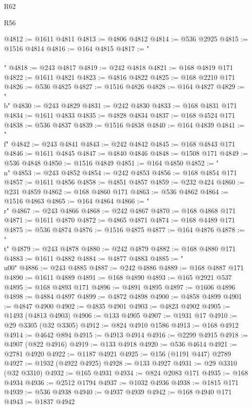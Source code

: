\begin{lexlean}{R62}
\begin{lexlean}{R56}
\begin{coremodule}
{{{{{{{{{{{{{{{{{{{{{{{{{{{{{{{{{{{{{{{{{{{{{{{{{{{{{{{{{{{{{{{{{{{{{{{{{{{{{{{{{{{{{{{{{{{{{{{{{{{{{{{{{{{{{{{{{{{{{{{{{{{{{{{{{{{{{{{{{{{{{{{{{{{{{{{{{{{{{{{{{{{{{{{{{{{{{{{{{{{{{{{{{{{{{{{{{{{{{{{{{{{{{{{{{{{@4812 := @1611 @4811
@4813 := @4806 @4812
@4814 := @536 @2925
@4815 := @1516 @4814
@4816 := @164 @4815
@4817 := "\\\\"
@4818 := @243 @4817
@4819 := @242 @4818
@4821 := @168 @4819 @171
@4822 := @1611 @4821
@4823 := @4816 @4822
@4825 := @168 @2210 @171
@4826 := @536 @4825
@4827 := @1516 @4826
@4828 := @164 @4827
@4829 := "\\b"
@4830 := @243 @4829
@4831 := @242 @4830
@4833 := @168 @4831 @171
@4834 := @1611 @4833
@4835 := @4828 @4834
@4837 := @168 @4524 @171
@4838 := @536 @4837
@4839 := @1516 @4838
@4840 := @164 @4839
@4841 := "\\f"
@4842 := @243 @4841
@4843 := @242 @4842
@4845 := @168 @4843 @171
@4846 := @1611 @4845
@4847 := @4840 @4846
@4848 := @1508 @171
@4849 := @536 @4848
@4850 := @1516 @4849
@4851 := @164 @4850
@4852 := "\\n"
@4853 := @243 @4852
@4854 := @242 @4853
@4856 := @168 @4854 @171
@4857 := @1611 @4856
@4858 := @4851 @4857
@4859 := @232 @424
@4860 := @231 @4859
@4862 := @168 @4860 @171
@4863 := @536 @4862
@4864 := @1516 @4863
@4865 := @164 @4864
@4866 := "\\r"
@4867 := @243 @4866
@4868 := @242 @4867
@4870 := @168 @4868 @171
@4871 := @1611 @4870
@4872 := @4865 @4871
@4874 := @168 @4489 @171
@4875 := @536 @4874
@4876 := @1516 @4875
@4877 := @164 @4876
@4878 := "\\t"
@4879 := @243 @4878
@4880 := @242 @4879
@4882 := @168 @4880 @171
@4883 := @1611 @4882
@4884 := @4877 @4883
@4885 := "\\u00"
@4886 := @243 @4885
@4887 := @242 @4886
@4889 := @168 @4887 @171
@4890 := @1611 @4889
@4891 := @168 @4890
@4893 := @165 @2921 @537
@4895 := @168 @4893 @171
@4896 := @4891 @4895
@4897 := @1606 @4896
@4898 := @4884 @4897
@4899 := @4872 @4898
@4900 := @4858 @4899
@4901 := @4847 @4900
@4902 := @4835 @4901
@4903 := @4823 @4902
@4905 := @1493 (@4813 @4903)
@4906 := @133 @4905
@4907 := @1931 @17
@4910 := @29 @3305 (@32 @3305)
@4912 := @824 @4910 @1586
@4913 := @168 @4912
@4914 := @4642 @894
@4915 := @4913 @4914
@4916 := @2299 @4915
@4918 := @4907 (@822 @4916)
@4919 := @133 @4918
@4920 := @536 @4614
@4921 := @2781 @4920
@4922 := @1187 @4921
@4925 := @156 (@1191 @447) @2789
@4927 := @1932 (@4922 @4925)
@4928 := @133 @4927
@4931 := @29 @3310 (@32 @3310)
@4932 := @165 @4931
@4934 := @824 @2083 @171
@4935 := @168 @4934
@4936 := @2512 @1794
@4937 := @1032 @4936
@4938 := @1815 @171
@4939 := @536 @4938
@4940 := @4937 @4939
@4942 := @168 @4940 @171
@4943 := @1837 @4942
}}}}}}}}}}}}}}}}}}}}}}}}}}}}}}}}}}}}}}}}}}}}}}}}}}}}}}}}}}}}}}}}}}}}}}}}}}}}}}}}}}}}}}}}}}}}}}}}}}}}}}}}}}}}}}}}}}}}}}}}}}}}}}}}}}}}}}}}}}}}}}}}}}}}}}}}}}}}}}}}}}}}}}}}}}}}}}}}}}}}}}}}}}}}}}}}}}}}}}}}}}}}}}}}}}}
\end{coremodule}
\end{lexlean}
\end{lexlean}

